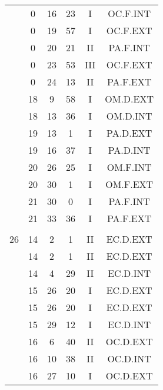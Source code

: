 \documentclass[12pt, a4paper]{article}
\begin{document}
\begin{multicols}{3}
{\begin{tabular}{c c c c c c}
	 	 	 	 & 0 & 16 & 23 & I & OC.F.INT\\%
	 	 	 	 & 0 & 19 & 57 & I & OC.F.EXT\\%
	 	 	 	 & 0 & 20 & 21 & II & PA.F.INT\\%
	 	 	 	 & 0 & 23 & 53 & III & OC.F.EXT\\%
	 	 	 	 & 0 & 24 & 13 & II & PA.F.EXT\\%
	 	 	 	 & 18 & 9 & 58 & I & OM.D.EXT\\%
	 	 	 	 & 18 & 13 & 36 & I & OM.D.INT\\%
	 	 	 	 & 19 & 13 & 1 & I & PA.D.EXT\\%
	 	 	 	 & 19 & 16 & 37 & I & PA.D.INT\\%
	 	 	 	 & 20 & 26 & 25 & I & OM.F.INT\\%
	 	 	 	 & 20 & 30 & 1 & I & OM.F.EXT\\%
	 	 	 	 & 21 & 30 & 0 & I & PA.F.INT\\%
	 	 	 	 & 21 & 33 & 36 & I & PA.F.EXT\\%
	 	 	 	 & & & & & \\%
	 	 	 	26 & 14 & 2 & 1 & II & EC.D.EXT\\%
	 	 	 	 & 14 & 2 & 1 & II & EC.D.EXT\\%
	 	 	 	 & 14 & 4 & 29 & II & EC.D.INT\\%
	 	 	 	 & 15 & 26 & 20 & I & EC.D.EXT\\%
	 	 	 	 & 15 & 26 & 20 & I & EC.D.EXT\\%
	 	 	 	 & 15 & 29 & 12 & I & EC.D.INT\\%
	 	 	 	 & 16 & 6 & 40 & II & OC.D.EXT\\%
	 	 	 	 & 16 & 10 & 38 & II & OC.D.INT\\%
	 	 	 	 & 16 & 27 & 10 & I & OC.D.EXT\\%

\end{tabular}}
\end{multicols}
\end{document}
